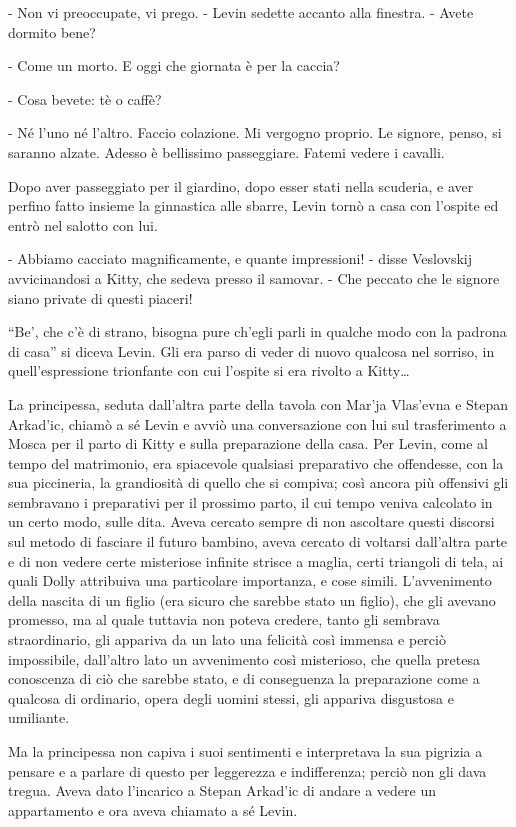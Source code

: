 - Non vi preoccupate, vi prego. - Levin sedette accanto alla finestra. - Avete dormito bene? 

- Come un morto. E oggi che giornata è per la caccia? 

- Cosa bevete: tè o caffè? 

- Né l'uno né l'altro. Faccio colazione. Mi vergogno proprio. Le signore, penso, si saranno alzate. Adesso è bellissimo passeggiare. Fatemi vedere i cavalli. 

Dopo aver passeggiato per il giardino, dopo esser stati nella scuderia, e aver perfino fatto insieme la ginnastica alle sbarre, Levin tornò a casa con l'ospite ed entrò nel salotto con lui. 

- Abbiamo cacciato magnificamente, e quante impressioni! - disse Veslovskij avvicinandosi a Kitty, che sedeva presso il samovar. - Che peccato che le signore siano private di questi piaceri! 

``Be', che c'è di strano, bisogna pure ch'egli parli in qualche modo con la padrona di casa'' si diceva Levin. Gli era parso di veder di nuovo qualcosa nel sorriso, in quell'espressione trionfante con cui l'ospite si era rivolto a Kitty\ldots{} 

La principessa, seduta dall'altra parte della tavola con Mar'ja Vlas'evna e Stepan Arkad'ic, chiamò a sé Levin e avviò una conversazione con lui sul trasferimento a Mosca per il parto di Kitty e sulla preparazione della casa. Per Levin, come al tempo del matrimonio, era spiacevole qualsiasi preparativo che offendesse, con la sua piccineria, la grandiosità di quello che si compiva; così ancora più offensivi gli sembravano i preparativi per il prossimo parto, il cui tempo veniva calcolato in un certo modo, sulle dita. Aveva cercato sempre di non ascoltare questi discorsi sul metodo di fasciare il futuro bambino, aveva cercato di voltarsi dall'altra parte e di non vedere certe misteriose infinite strisce a maglia, certi triangoli di tela, ai quali Dolly attribuiva una particolare importanza, e cose simili. L'avvenimento della nascita di un figlio (era sicuro che sarebbe stato un figlio), che gli avevano promesso, ma al quale tuttavia non poteva credere, tanto gli sembrava straordinario, gli appariva da un lato una felicità così immensa e perciò impossibile, dall'altro lato un avvenimento così misterioso, che quella pretesa conoscenza di ciò che sarebbe stato, e di conseguenza la preparazione come a qualcosa di ordinario, opera degli uomini stessi, gli appariva disgustosa e umiliante. 

Ma la principessa non capiva i suoi sentimenti e interpretava la sua pigrizia a pensare e a parlare di questo per leggerezza e indifferenza; perciò non gli dava tregua. Aveva dato l'incarico a Stepan Arkad'ic di andare a vedere un appartamento e ora aveva chiamato a sé Levin. 

